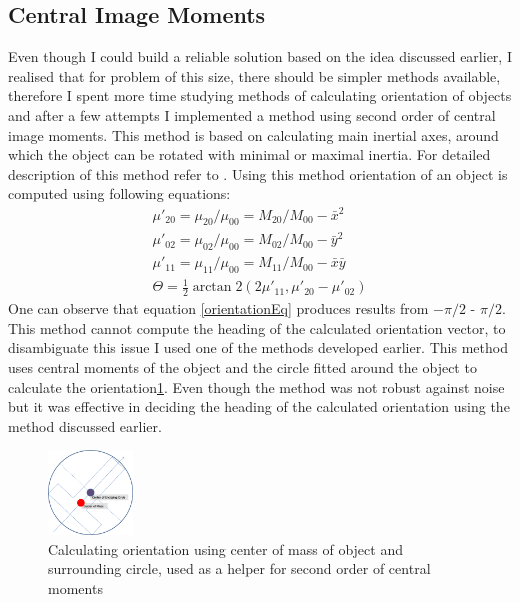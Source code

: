 \documentclass[conference,12pt]{IEEEtran}
\begin{document}
\subsection{Central Image Moments}
Even though I could build a reliable solution based on the idea discussed earlier, I realised that for problem of this size, there should be simpler methods available, therefore I spent more time studying methods of calculating orientation of objects and after a few attempts I implemented a method using second order of central image moments.
This method is based on calculating main inertial axes, around which the object can be rotated with minimal or maximal inertia. For detailed description of this method refer to \cite{Teague:80}. Using this method orientation of an object is computed using following equations:
\begin{align}
\label{equ:centroid}
\mu'_{20} = \mu_{20} / \mu_{00} = M_{20}/M_{00} - \bar{x}^2 \\
\mu'_{02} = \mu_{02} / \mu_{00} = M_{02}/M_{00} - \bar{y}^2 \\
\mu'_{11} = \mu_{11} / \mu_{00} = M_{11}/M_{00} - \bar{x}\bar{y} \\
\Theta = \frac{1}{2} \arctan2 \left( {2\mu'_{11}},{\mu'_{20} - \mu'_{02}} \right) \label{orientationEq}
\end{align}
One can observe that equation \ref{orientationEq} produces results from $-\pi/2$ - $\pi/2$. This method cannot compute the heading of the calculated orientation vector, to disambiguate this issue I used one of the methods developed earlier. This method uses central moments of the object and the circle fitted around the object to calculate the orientation\ref{fig:CircleMethod}. Even though the method was not robust against noise but it was effective in deciding the heading of the calculated orientation using the method discussed earlier. 
\begin{figure}[htp]
\begin{center}
\leavevmode
\includegraphics[width=0.2\textwidth] {CenOrien.png}
\end{center}
\caption{Calculating orientation using center of mass of object and surrounding circle, used as a helper for second order of central moments}
\label{fig:CircleMethod}
\end{figure} 
\end{document}
